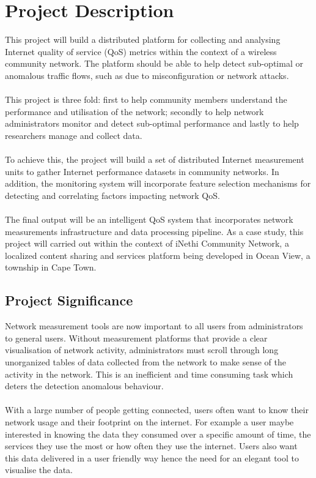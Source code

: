  \section{Project Description}
This project will build a distributed platform for collecting and analysing Internet quality of service (QoS) metrics within the context of a wireless community network. The platform should be able to help detect sub-optimal or anomalous traffic flows, such as due to misconfiguration or network attacks.
\paragraph{}
This project is three fold: first to help community members understand the performance and utilisation of the network; secondly to help network administrators monitor and detect sub-optimal performance and lastly to help researchers manage and collect data.
\paragraph{}
To achieve this, the project will build a set of distributed Internet measurement units to gather Internet performance datasets in community networks. In addition, the monitoring system will incorporate feature selection mechanisms for detecting and correlating factors impacting network QoS.
\paragraph{}
The final output will be an intelligent QoS system that incorporates network measurements infrastructure and data processing pipeline. As a case study, this project will carried out within the context of iNethi Community Network, a localized content sharing and services platform being developed in Ocean View, a township in Cape Town.


\subsection{Project Significance}
Network measurement tools are now important to all users from administrators to general users. Without measurement platforms that provide a clear visualisation of network activity, administrators must scroll through long unorganized tables of data collected from the network to make sense of the activity in the network. This is an inefficient and time consuming task which deters the detection anomalous behaviour.
\paragraph{}
With a large number of people getting connected, users often want to know their network usage and their footprint on the internet. For example a user maybe interested in knowing the data they consumed over a specific amount of time, the services they use the most or how often they use the internet. Users also want this data delivered in a user friendly way hence the need for an elegant tool to visualise the data.
